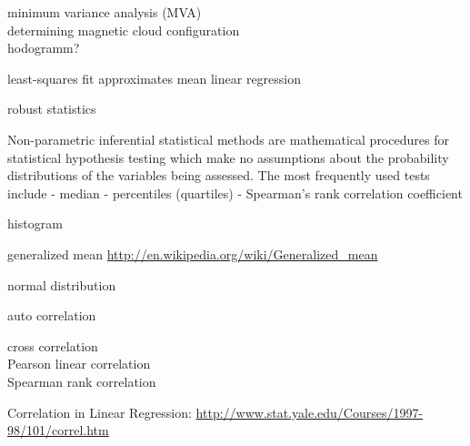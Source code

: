 minimum variance analysis (MVA)\\
determining magnetic cloud configuration \citep{Bothmer1998}\\

hodogramm?



least-squares fit approximates mean
linear regression

robust statistics

Non-parametric inferential statistical methods are mathematical procedures for statistical hypothesis testing which make no assumptions about the probability distributions of the variables being assessed. The most frequently used tests include
- median
- percentiles (quartiles)
- Spearman's rank correlation coefficient

histogram

generalized mean
\url{http://en.wikipedia.org/wiki/Generalized_mean}


normal distribution

% 
% 


auto correlation

cross correlation\\
Pearson linear correlation\\
Spearman rank correlation

Correlation in Linear Regression: \url{http://www.stat.yale.edu/Courses/1997-98/101/correl.htm}\\
